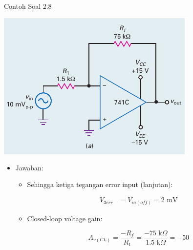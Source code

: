 \begin{frame}{Contoh Soal 2.8}
	\begin{multicols}{2}
		\begin{center}
			\includegraphics[width=\linewidth]{gambar/fig-16.17a}
		\end{center}
		\columnbreak
		\begin{itemize}
			\item Jawaban:
			\begin{itemize}
				\item Sehingga ketiga tegangan error input (lanjutan):
				
				\begin{align*}
					V_{3err} &= V_{in(off)} = 2 \text{ mV}
				\end{align*}
				
				\item Closed-loop voltage gain:
				
				\[ A_{v(CL)} = \frac{-R_f}{R_1} = \frac{-75 \text{ k}\Omega}{1.5 \text{ k}\Omega} = -50\]
				
			\end{itemize}
		\end{itemize}
	\end{multicols}
\end{frame}

